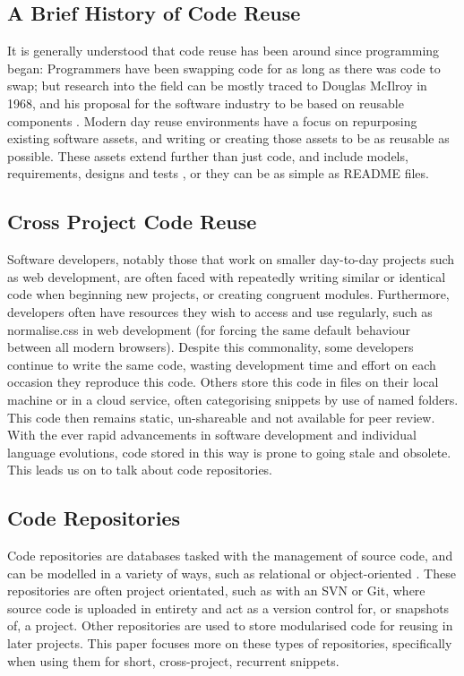 \documentclass[11pt,openright,a4paper]{report}
\begin{document}
\subsection{A Brief History of Code Reuse}
It is generally understood that code reuse has been around since programming began: Programmers have been swapping code for as long as there was code to swap; but research into the field can be mostly traced to Douglas McIlroy in 1968, and his proposal for the software industry to be based on reusable components \cite{Naur1969,Jacobson1997}. 
Modern day reuse environments have a focus on repurposing existing software assets, and writing or creating those assets to be as reusable as possible. These assets extend further than just code, and include models, requirements, designs and tests \cite{Grinter2001}, or they can be as simple as README files.

\subsection{Cross Project Code Reuse}
Software developers, notably those that work on smaller day-to-day projects such as web development, are often faced with repeatedly writing similar or identical code when beginning new projects, or creating congruent modules. Furthermore, developers often have resources they wish to access and use regularly, such as normalise.css in web development (for forcing the same default behaviour between all modern browsers).
Despite this commonality, some developers continue to write the same code, wasting development time and effort on each occasion they reproduce this code. 
Others store this code in files on their local machine or in a cloud service, often categorising snippets by use of named folders. This code then remains static, un-shareable and not available for peer review. 
With the ever rapid advancements in software development and individual language evolutions, code stored in this way is prone to going stale and obsolete. This leads us on to talk about code repositories.

\subsection{Code Repositories}
Code repositories are databases tasked with the management of source code, and can be modelled in a variety of ways, such as relational or object-oriented \cite{Cox1999}.
These repositories are often project orientated, such as with an SVN or Git, where source code is uploaded in entirety and act as a version control for, or snapshots of, a project.
Other repositories are used to store modularised code for reusing in later projects. This paper focuses more on these types of repositories, specifically when using them for short, cross-project, recurrent snippets.
\end{document}
